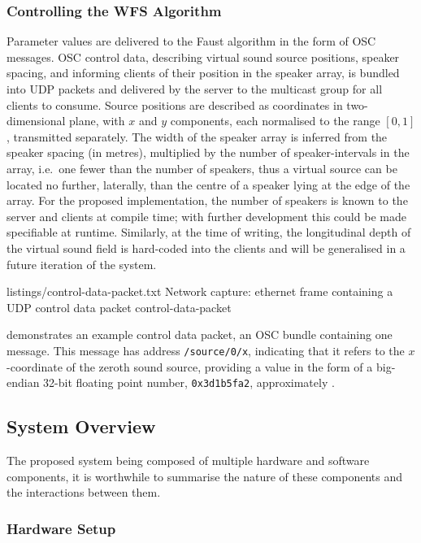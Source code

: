 \subsubsection{Controlling the WFS Algorithm}

Parameter values are delivered to the Faust algorithm in the form of OSC
messages.
OSC control data, describing virtual sound source positions, speaker spacing,
and informing clients of their position in the speaker array, is bundled into
UDP packets and delivered by the server to the multicast group for all clients
to consume.
Source positions are described as coordinates in two-dimensional plane, with
$x$ and $y$ components, each normalised to the range $[0,1]$, transmitted
separately.
The width of the speaker array is inferred from the speaker spacing (in
metres), multiplied by the number of speaker-intervals in the array, i.e.\ one
fewer than the number of speakers, thus a virtual source can be located no
further, laterally, than the centre of a speaker lying at the edge of the array.
For the proposed implementation, the number of speakers is known to the server
and clients at compile time; with further development this could be made
specifiable at runtime.
Similarly, at the time of writing, the longitudinal depth of the virtual
sound field is hard-coded into the clients and will be generalised in a future
iteration of the system.

{listings/control-data-packet.txt}
{Network capture: ethernet frame containing a UDP control data packet}
{control-data-packet}

 demonstrates an example control data
packet, an OSC bundle containing one message.
This message has address \texttt{/source/0/x}, indicating that it refers to the
$x$-coordinate of the zeroth sound source, providing a value in the form of a
big-endian 32-bit floating point number, \texttt{0x3d1b5fa2}, approximately
.

\subsection{System Overview}\label{subsec:system-overview}

The proposed system being composed of multiple hardware and software components,
it is worthwhile to summarise the nature of these components and the
interactions between them.

\subsubsection{Hardware Setup}

